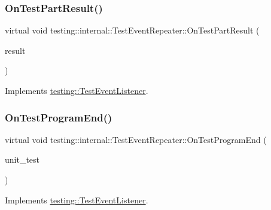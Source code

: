 \subsubsection{\texorpdfstring{OnTestPartResult()}{OnTestPartResult()}}
{\footnotesize\ttfamily virtual void testing\+::internal\+::\+Test\+Event\+Repeater\+::\+On\+Test\+Part\+Result (\begin{DoxyParamCaption}\item[{const Test\+Part\+Result \&}]{result }\end{DoxyParamCaption})\hspace{0.3cm}{\ttfamily [virtual]}}



Implements \mbox{\hyperlink{classtesting_1_1TestEventListener_a054f8705c883fa120b91473aff38f2ee}{testing\+::\+Test\+Event\+Listener}}.

\mbox{\label{classtesting_1_1internal_1_1TestEventRepeater_a4622616259747dbcc23f5ee39ef99ec0}} 
\subsubsection{\texorpdfstring{OnTestProgramEnd()}{OnTestProgramEnd()}}
{\footnotesize\ttfamily virtual void testing\+::internal\+::\+Test\+Event\+Repeater\+::\+On\+Test\+Program\+End (\begin{DoxyParamCaption}\item[{const \mbox{\hyperlink{classtesting_1_1UnitTest}{Unit\+Test}} \&}]{unit\+\_\+test }\end{DoxyParamCaption})\hspace{0.3cm}{\ttfamily [virtual]}}



Implements \mbox{\hyperlink{classtesting_1_1TestEventListener_ad15b6246d94c268e233487a86463ef3d}{testing\+::\+Test\+Event\+Listener}}.

\mbox{\label{classtesting_1_1internal_1_1TestEventRepeater_a15ee2ff051063088d3a89a266d5ffcc4}} 
